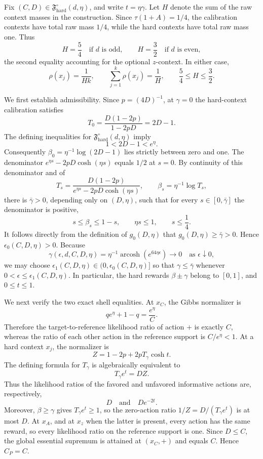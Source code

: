 Fix \((C,D)\in\mathfrak F_{\mathrm{hard}}^\circ(d,\eta)\), and write \(t=\eta\gamma\). Let \(H\) denote the sum of the raw context masses in the construction. Since \(\tau(1+A)=1/4\), the calibration contexts have total raw mass \(1/4\), while the hard contexts have total raw mass one. Thus
\[
H=\frac54
\quad\text{if \(d\) is odd},
\qquad
H=\frac32
\quad\text{if \(d\) is even},
\]
the second equality accounting for the optional \(z\)-context. In either case,
\[
\rho(x_j)=\frac{1}{Hk},
\qquad
\sum_{j=1}^k\rho(x_j)=\frac1H,
\qquad
\frac54\le H\le\frac32.
\]

We first establish admissibility. Since \(p=(4D)^{-1}\), at \(\gamma=0\) the hard-context calibration satisfies
\[
T_0=\frac{D(1-2p)}{1-2pD}=2D-1.
\]
The defining inequalities for \(\mathfrak F_{\mathrm{hard}}^\circ(d,\eta)\) imply
\[
1<2D-1<e^\eta.
\]
Consequently \(\beta_0=\eta^{-1}\log(2D-1)\) lies strictly between zero and one. The denominator \(e^{\eta s}-2pD\cosh(\eta s)\) equals \(1/2\) at \(s=0\). By continuity of this denominator and of
\[
T_s=\frac{D(1-2p)}{e^{\eta s}-2pD\cosh(\eta s)},
\qquad
\beta_s=\eta^{-1}\log T_s,
\]
there is \(\bar\gamma>0\), depending only on \((D,\eta)\), such that for every \(s\in[0,\bar\gamma]\) the denominator is positive,
\[
s\le\beta_s\le1-s,
\qquad
\eta s\le1,
\qquad
s\le\frac14.
\]
It follows directly from the definition of \(g_0(D,\eta)\) that \(g_0(D,\eta)\ge\bar\gamma>0\). Hence \(\epsilon_0(C,D,\eta)>0\). Because
\[
\gamma(\epsilon,d,C,D,\eta)
=\eta^{-1}\operatorname{arcosh}(e^{64\eta\epsilon})
\longrightarrow0
\quad\text{as \(\epsilon\downarrow0\)},
\]
we may choose \(\epsilon_1(C,D,\eta)\in(0,\epsilon_0(C,D,\eta)]\) so that \(\gamma\le\bar\gamma\) whenever \(0<\epsilon\le\epsilon_1(C,D,\eta)\). In particular, the hard rewards \(\beta\pm\gamma\) belong to \([0,1]\), and \(0\le t\le1\).

We next verify the two exact shell equalities. At \(x_C\), the Gibbs normalizer is
\[
q e^\eta+1-q=\frac{e^\eta}{C}.
\]
Therefore the target-to-reference likelihood ratio of action \(+\) is exactly \(C\), whereas the ratio of each other action in the reference support is \(C/e^\eta<1\). At a hard context \(x_j\), the normalizer is
\[
Z=1-2p+2pT_\gamma\cosh t.
\]
The defining formula for \(T_\gamma\) is algebraically equivalent to
\[
T_\gamma e^t=DZ.
\]
Thus the likelihood ratios of the favored and unfavored informative actions are, respectively,
\[
D
\quad\text{and}\quad
De^{-2t}.
\]
Moreover, \(\beta\ge\gamma\) gives \(T_\gamma e^t\ge1\), so the zero-action ratio \(1/Z=D/(T_\gamma e^t)\) is at most \(D\). At \(x_A\), and at \(x_z\) when the latter is present, every action has the same reward, so every likelihood ratio on the reference support is one. Since \(D\le C\), the global essential supremum is attained at \((x_C,+)\) and equals \(C\). Hence \(C_P=C\).

